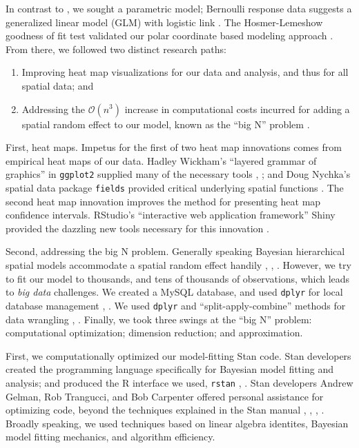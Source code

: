 In contrast to \cite{Cross2015}, we sought a parametric model; Bernoulli response data suggests a generalized linear model (GLM) with logistic link \citep{Myers2012}. The Hosmer-Lemeshow goodness of fit test validated our polar coordinate based modeling approach \cite{Hosmer2013}. From there, we followed two distinct research paths:
\begin{enumerate}
\item Improving heat map visualizations for our data and analysis, and thus for all spatial data; and 
\item Addressing the $\mathcal{O}(n^{3})$ increase in computational costs incurred for adding a spatial random effect to our model, known as the ``big N'' problem \citep{Finley2009}. 
\end{enumerate}
First, heat maps. Impetus for the first of two heat map innovations comes from empirical heat maps of our data. Hadley Wickham's ``layered grammar of graphics'' in \verb|ggplot2| supplied many of the necessary tools \citep{Wickham2009}, \citep{Wickham2010}; and Doug Nychka's spatial data package \verb|fields| provided critical underlying spatial functions \citep{Nychka}. The second heat map innovation improves the method for presenting heat map confidence intervals. RStudio's ``interactive web application framework'' Shiny provided the dazzling new tools necessary for this innovation \citep{Shiny}.

Second, addressing the big N problem. Generally speaking Bayesian hierarchical spatial models accommodate a spatial random effect handily \citep{Gelman2014}, \citep{Banerjee2014}, \citep{Oliver2005}. However, we try to fit our model to thousands, and tens of thousands of observations, which leads to {\it big data} challenges. We created a MySQL database, and used \verb|dplyr| for local database management \citep{Wickham2016}, \citep{Tahaghoghi2006}. We used \verb|dplyr| and ``split-apply-combine'' methods for data wrangling \citep{Wickham2016}, \citep{wrangling}. Finally, we took three swings at the ``big N'' problem: computational optimization; dimension reduction; and approximation.

First, we computationally optimized our model-fitting Stan code. Stan developers created the programming language specifically for Bayesian model fitting and analysis; and produced the R interface we used, \verb|rstan| \citep{rstan}, \citep{Gelman2015}. Stan developers Andrew Gelman, Rob Trangucci, and Bob Carpenter offered personal assistance for optimizing code, beyond the techniques explained in the Stan manual \citep{Gelman}, \citep{Trangucci}, \citep{Carpenter}, \citep{STANtheMan}. Broadly speaking, we used techniques based on linear algebra identites, Bayesian model fitting mechanics, and algorithm efficiency.


